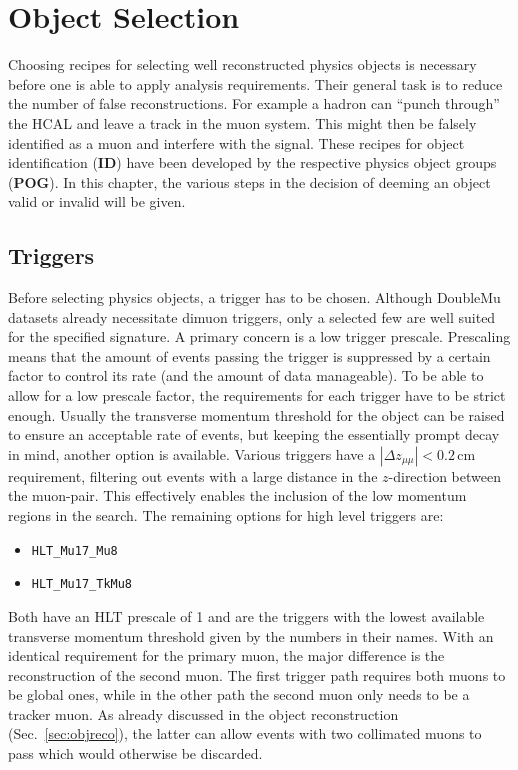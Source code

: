 \chapter{Object Selection}
\label{cha:objsel}

Choosing recipes for selecting well reconstructed physics objects is necessary before one is able to apply analysis requirements. Their general task is to reduce the number of false reconstructions. For example a hadron can ``punch through'' the HCAL and leave a track in the muon system. This might then be falsely identified as a muon and interfere with the signal. These recipes for object identification (\textbf{ID}) have been developed by the respective physics object groups (\textbf{POG}). In this chapter, the various steps in the decision of deeming an object valid or invalid will be given.

\section{Triggers}
\label{sec:trigger}

Before selecting physics objects, a trigger has to be chosen. Although DoubleMu datasets already necessitate dimuon triggers, only a selected few are well suited for the specified signature. A primary concern is a low trigger prescale. Prescaling means that the amount of events passing the trigger is suppressed by a certain factor to control its rate (and the amount of data manageable). To be able to allow for a low prescale factor, the requirements for each trigger have to be strict enough. Usually the transverse momentum threshold for the object can be raised to ensure an acceptable rate of events, but keeping the essentially prompt decay in mind, another option is available. Various triggers have a $|\Delta z_{\mu\mu}| < 0.2\,\text{cm}$ requirement, filtering out events with a large distance in the $z$-direction between the muon-pair. This effectively enables the inclusion of the low momentum regions in the search. The remaining options for high level triggers are:

\begin{itemize}
\item \verb+HLT_Mu17_Mu8+
\item \verb+HLT_Mu17_TkMu8+
\end{itemize}

Both have an HLT prescale of 1 and are the triggers with the lowest available transverse momentum threshold given by the numbers in their names. With an identical requirement for the primary muon, the major difference is the reconstruction of the second muon. The first trigger path requires both muons to be global ones, while in the other path the second muon only needs to be a tracker muon. As already discussed in the object reconstruction (Sec.~\ref{sec:objreco}), the latter can allow events with two collimated muons to pass which would otherwise be discarded.


